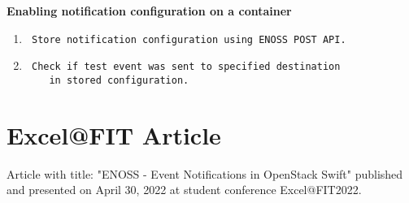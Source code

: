 \textbf{Enabling notification configuration on a container}
\begin{enumerate}
    \item \begin{verbatim} Store notification configuration using ENOSS POST API.\end{verbatim}
    \item \begin{verbatim} Check if test event was sent to specified destination
    in stored configuration.\end{verbatim}
\end{enumerate}





\chapter{Excel@FIT Article}
Article with title: "ENOSS - Event Notifications in OpenStack Swift" published and presented on April 30, 2022 at student conference Excel@FIT2022.

